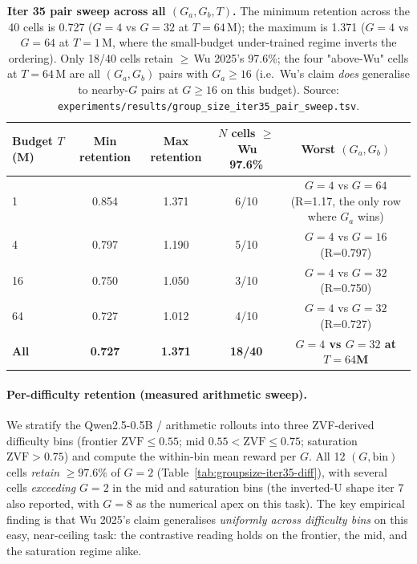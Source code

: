 \begin{table}[htbp]
\centering
\small
\begin{tabular}{lcccc}
\toprule
Budget $T$ (M) & Min retention & Max retention & $N$ cells $\ge$\,Wu 97.6\% & Worst $(G_a, G_b)$ \\
\midrule
1   & 0.854  & 1.371 & 6/10  & $G{=}4$ vs $G{=}64$ (R=1.17, the only row where $G_a$ wins) \\
4   & 0.797  & 1.190 & 5/10  & $G{=}4$ vs $G{=}16$ (R=0.797) \\
16  & 0.750  & 1.050 & 3/10  & $G{=}4$ vs $G{=}32$ (R=0.750) \\
64  & 0.727  & 1.012 & 4/10  & $G{=}4$ vs $G{=}32$ (R=0.727) \\
\midrule
\textbf{All} & \textbf{0.727} & \textbf{1.371} & \textbf{18/40} & \textbf{$G{=}4$ vs $G{=}32$ at $T{=}64$M} \\
\bottomrule
\end{tabular}
\caption{\textbf{Iter 35 pair sweep across all $(G_a, G_b, T)$.}
The minimum retention across the 40 cells is 0.727
($G{=}4$ vs $G{=}32$ at $T{=}64$\,M); the maximum is 1.371
($G{=}4$ vs $G{=}64$ at $T{=}1$\,M, where the small-budget
under-trained regime inverts the ordering). Only 18/40 cells retain
$\ge$\,Wu 2025's 97.6\%; the four "above-Wu" cells at $T{=}64$\,M
are all $(G_a, G_b)$ pairs with $G_a \ge 16$ (i.e.\ Wu's claim
\emph{does} generalise to nearby-$G$ pairs at $G \ge 16$ on this
budget).  Source: \texttt{experiments/results/group\_size\_iter35\_pair\_sweep.tsv}.}
\label{tab:groupsize-iter35-pair}
\end{table}

\paragraph{Per-difficulty retention (measured arithmetic sweep).}
We stratify the Qwen2.5-0.5B / arithmetic rollouts into three
ZVF-derived difficulty bins (frontier $\mathrm{ZVF} \le 0.55$;
mid $0.55 < \mathrm{ZVF} \le 0.75$; saturation $\mathrm{ZVF} > 0.75$)
and compute the within-bin mean reward per $G$. All 12
$(G, \mathrm{bin})$ cells \emph{retain} $\ge 97.6\%$ of $G{=}2$
(Table~\ref{tab:groupsize-iter35-diff}), with several cells
\emph{exceeding} $G{=}2$ in the mid and saturation bins (the
inverted-U shape iter 7 also reported, with $G{=}8$ as the numerical
apex on this task). The key empirical finding is that
Wu 2025's claim generalises \emph{uniformly across difficulty bins}
on this easy, near-ceiling task: the contrastive reading holds on
the frontier, the mid, and the saturation regime alike.

